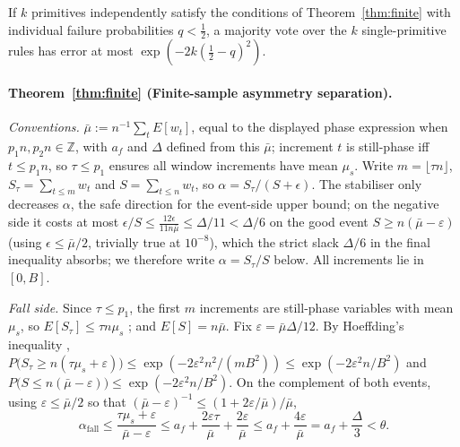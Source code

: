 \begin{corollary}\label{cor:multi}
If $k$ primitives independently satisfy the conditions of Theorem~\ref{thm:finite} with individual failure probabilities $q<\tfrac12$, a majority vote over the $k$ single-primitive rules has error at most $\exp(-2k(\tfrac12-q)^2)$.
\end{corollary}

\paragraph{Theorem~\ref{thm:finite} (Finite-sample asymmetry separation).}
\emph{Conventions.} $\bar\mu:=n^{-1}\sum_t E[w_t]$, equal to the displayed phase expression when $p_1n,p_2n\in\mathbb{Z}$, with $a_f$ and $\Delta$ defined from this $\bar\mu$; increment $t$ is still-phase iff $t\leq p_1n$, so $\tau\leq p_1$ ensures all window increments have mean $\mu_s$. Write $m=\lfloor\tau n\rfloor$, $S_\tau=\sum_{t\leq m} w_t$ and $S=\sum_{t\leq n} w_t$, so $\alpha=S_\tau/(S+\epsilon)$. The stabiliser only decreases $\alpha$, the safe direction for the event-side upper bound; on the negative side it costs at most $\epsilon/S\leq\tfrac{12\epsilon}{11n\bar\mu}\leq\Delta/11<\Delta/6$ on the good event $S\geq n(\bar\mu-\varepsilon)$ (using $\epsilon\leq\bar\mu/2$, trivially true at $10^{-8}$), which the strict slack $\Delta/6$ in the final inequality absorbs; we therefore write $\alpha=S_\tau/S$ below. All increments lie in $[0,B]$.

\emph{Fall side.} Since $\tau\leq p_1$, the first $m$ increments are still-phase variables with mean $\mu_s$, so $E[S_\tau]\leq\tau n\mu_s$ ; and $E[S]=n\bar\mu$. Fix $\varepsilon=\bar\mu\Delta/12$. By Hoeffding's inequality \citep{hoeffding1963},
$P\big(S_\tau\geq n(\tau\mu_s+\varepsilon)\big)\leq\exp(-2\varepsilon^2 n^2/(mB^2))\leq\exp(-2\varepsilon^2 n/B^2)$ and
$P\big(S\leq n(\bar\mu-\varepsilon)\big)\leq\exp(-2\varepsilon^2 n/B^2)$.
On the complement of both events, using $\varepsilon\leq\bar\mu/2$ so that $(\bar\mu-\varepsilon)^{-1}\leq(1+2\varepsilon/\bar\mu)/\bar\mu$,
\[
\alpha_{\mathrm{fall}}\leq\frac{\tau\mu_s+\varepsilon}{\bar\mu-\varepsilon}
\leq a_f+\frac{2\varepsilon\tau}{\bar\mu}+\frac{2\varepsilon}{\bar\mu}
\leq a_f+\frac{4\varepsilon}{\bar\mu}=a_f+\frac{\Delta}{3}<\theta .
\]

